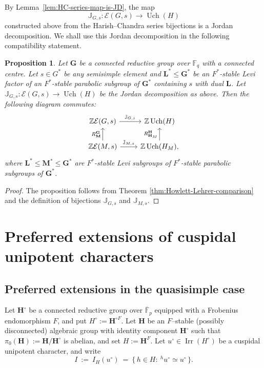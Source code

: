 \documentclass{amsart}
\theoremstyle{plain}
\numberwithin{equation}{section}
\newtheorem{proposition}[theorem]{Proposition}
\theoremstyle{definition}
\newcommand{\cE}{\mathcal{E}}
\newcommand{\Irr}{\operatorname{Irr}}
\newcommand{\fq}{\mathbb{F}_{q}}
\newcommand{\Uch}{\operatorname{Uch}}
\newcommand{\J}{\mathbb{J}}
\newcommand{\bG}{\mathbf{G}}
\newcommand{\bL}{\mathbf{L}}
\newcommand{\bM}{\mathbf{M}}
\newcommand{\bH}{\mathbf{H}}
\begin{document}
By Lemma~\ref{lem:HC-series-map-is-JD}, the map
\[
\J_{G,s}:\cE(G,s)\longrightarrow \Uch(H)
\]
constructed above from the Harish--Chandra series bijections is a Jordan
decomposition.  We shall use this Jordan decomposition in the following
compatibility statement.
\begin{proposition}\label{prop:HC-induction-connected-centre}
Let $\bG$ be a connected reductive group over $\fq$ with a connected centre.
Let $s\in G^{*}$ be any semisimple element and $\bL^*\leq \bG^*$  be an  $F^*$-stable  Levi factor of an $F^*$-stable parabolic subgroup of $\bG^*$ containing $s$ with dual $\bL$.
Let $\J_{G,s}:\cE(G,s)\rightarrow\Uch(H)$ be the Jordan decomposition as above. Then the following diagram commutes:
\[
\begin{tikzcd}
\mathbb{Z}\cE(G,s)\arrow[r,"\J_{G,s}"]
&\mathbb{Z}\Uch(H)\\
\mathbb{Z}\cE(M,s)\arrow[r,"\J_{M,s}"]\arrow[u,"R_{\bM}^{\bG}"]
& \mathbb{Z}\Uch(H_M)\arrow[u,"R_{\bH_M}^{\bH}"],
\end{tikzcd}
\]
where $\bL^*\leq \bM^*\leq \bG^*$ are $F^*$-stable Levi subgroups of $F^*$-stable parabolic subgroups of $\bG^*$.
\end{proposition}
\begin{proof}
The proposition follows from Theorem \ref{thm:Howlett-Lehrer-comparison} and the definition of bijections $\J_{G,s}$ and $\J_{M,s}$.
\end{proof}

\section{Preferred extensions of cuspidal unipotent characters}
\label{sec:preferred-extensions-cuspidal-unipotents}

\subsection{Preferred extensions in the quasisimple case}
Let $\mathbf H^\circ$ be a connected reductive group over $\overline{\mathbb F}_p$
equipped with a Frobenius endomorphism $F$, and put $H^\circ:=\mathbf H^{\circ F}$.
Let $\mathbf H$ be an $F$--stable (possibly disconnected) algebraic group with identity component
$\mathbf H^\circ$ such that $\pi_0(\mathbf H):=\mathbf H/\mathbf H^\circ$ is abelian, and set
$H:=\mathbf H^F$.
Let $u^\circ\in\Irr(H^\circ)$ be a cuspidal unipotent character, and write
\[
I \ :=\ I_H(u^\circ)\ =\ \{\,h\in H:\ {}^hu^\circ\simeq u^\circ\,\}.
\]
\end{document}
